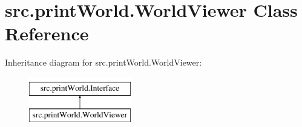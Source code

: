\hypertarget{classsrc_1_1print_world_1_1_world_viewer}{\section{src.\-print\-World.\-World\-Viewer \-Class \-Reference}
\label{classsrc_1_1print_world_1_1_world_viewer}
}
\-Inheritance diagram for src.\-print\-World.\-World\-Viewer\-:\begin{figure}[H]
\begin{center}
\leavevmode
\includegraphics[height=2.000000cm]{classsrc_1_1print_world_1_1_world_viewer}
\end{center}
\end{figure}

